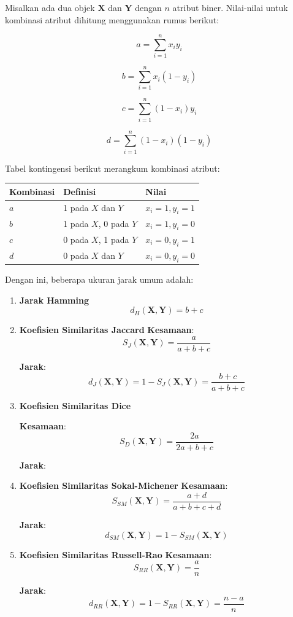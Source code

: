 \documentclass[
  oneside]{book}
\begin{document}
Misalkan ada dua objek \(\mathbf{X}\) dan \(\mathbf{Y}\) dengan \(n\) atribut biner. Nilai-nilai untuk kombinasi atribut dihitung menggunakan rumus berikut:

\[
a = \sum_{i=1}^n x_i y_i
\]

\[
b = \sum_{i=1}^n x_i (1 - y_i)
\]

\[
c = \sum_{i=1}^n (1 - x_i) y_i
\]

\[
d = \sum_{i=1}^n (1 - x_i)(1 - y_i)
\]

Tabel kontingensi berikut merangkum kombinasi atribut:

\begin{longtable}[]{@{}lll@{}}
\toprule\noalign{}
Kombinasi & Definisi & Nilai \\
\midrule\noalign{}
\endhead
\bottomrule\noalign{}
\endlastfoot
\(a\) & 1 pada \(X\) dan \(Y\) & \(x_i = 1, y_i = 1\) \\
\(b\) & 1 pada \(X\), 0 pada \(Y\) & \(x_i = 1, y_i = 0\) \\
\(c\) & 0 pada \(X\), 1 pada \(Y\) & \(x_i = 0, y_i = 1\) \\
\(d\) & 0 pada \(X\) dan \(Y\) & \(x_i = 0, y_i = 0\) \\
\end{longtable}

Dengan ini, beberapa ukuran jarak umum adalah:

\begin{enumerate}
\def\labelenumi{\arabic{enumi}.}
\item
  \textbf{Jarak Hamming} \[
  d_H(\mathbf{X}, \mathbf{Y}) = b + c
  \]
\item
  \textbf{Koefisien Similaritas Jaccard} \textbf{Kesamaan}: \[
  S_J(\mathbf{X}, \mathbf{Y}) = \frac{a}{a + b + c}
  \]

  \textbf{Jarak}: \[
  d_J(\mathbf{X}, \mathbf{Y}) = 1 - S_J(\mathbf{X}, \mathbf{Y}) = \frac{b + c}{a + b + c}
  \]
\item
  \textbf{Koefisien Similaritas Dice}

  \textbf{Kesamaan}: \[
  S_D(\mathbf{X}, \mathbf{Y}) = \frac{2a}{2a + b + c}
  \]

  \textbf{Jarak}:
\item
  \textbf{Koefisien Similaritas Sokal-Michener} \textbf{Kesamaan}: \[
  S_{SM}(\mathbf{X}, \mathbf{Y}) = \frac{a + d}{a + b + c + d}
  \]

  \textbf{Jarak}: \[
  d_{SM}(\mathbf{X}, \mathbf{Y}) = 1 - S_{SM}(\mathbf{X}, \mathbf{Y})
  \]
\item
  \textbf{Koefisien Similaritas Russell-Rao} \textbf{Kesamaan}: \[
  S_{RR}(\mathbf{X}, \mathbf{Y}) = \frac{a}{n}
  \]

  \textbf{Jarak}: \[
  d_{RR}(\mathbf{X}, \mathbf{Y}) = 1 - S_{RR}(\mathbf{X}, \mathbf{Y}) = \frac{n - a}{n}
  \]
\end{enumerate}
\end{document}
